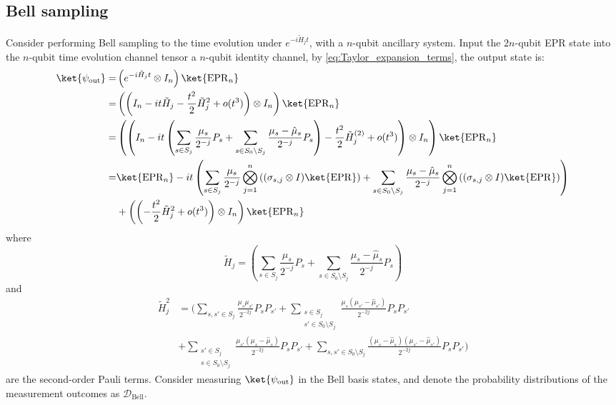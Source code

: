 \documentclass[twocolumn,superscriptaddress,aps,showpacs,amsmath,amstex,amssymb,citeautoscript,floatfix,pra,preprintnumbers]{revtex4-2}
\theoremstyle{plain}
\theoremstyle{plain}
\theoremstyle{plain}
\theoremstyle{plain}
\theoremstyle{plain}
\theoremstyle{plain}
\newcommand{\EPR}{\mathrm{EPR}}
\begin{document}
\begin{appendix}
\subsection{Bell sampling}
\label{sec:Bell_sampling}
Consider performing Bell sampling to the time evolution under $e^{-i\tilde{H}_jt}$, with a $n$-qubit ancillary system. Input the $2n$-qubit EPR state into the $n$-qubit time evolution channel tensor a $n$-qubit identity channel, by \eqref{eq:Taylor_expansion_terms}, the output state is:
\begin{equation}
\begin{split}
    \ket{\psi_{\text{out}}} =& \left(e^{-i\tilde{H}_jt}\otimes I_n\right)\ket{\EPR_n}\\
    =& \left(\left(I_n - it\tilde{H}_j - \frac{t^2}{2}\tilde{H}_j^{2} + o(t^3) \right)\otimes I_n\right)\ket{\EPR_n}\\
    =& \left(\left(I_n - it\left(\sum_{s\in S_j}\frac{\mu_s}{2^{-j}}P_s + \sum_{s\in S_0\setminus S_j}\frac{\mu_s-\hat{\mu}_s}{2^{-j}}P_s\right) - \frac{t^2}{2}\tilde{H}_j^{(2)} + o(t^3) \right)\otimes I_n\right)\ket{\EPR_n}\\
    =& \ket{\EPR_n} - it\left(\sum_{s\in S_j}\frac{\mu_s}{2^{-j}}\bigotimes_{j=1}^n \left((\sigma_{s,j}\otimes I)\ket{\EPR}\right) + \sum_{s\in S_0\setminus S_j}\frac{\mu_s-\hat{\mu}_s}{2^{-j}}\bigotimes_{j=1}^n \left((\sigma_{s,j}\otimes I)\ket{\EPR}\right)\right)\\
    &+ \left(\left(- \frac{t^2}{2}\tilde{H}_j^{2} + o(t^3)\right)\otimes I_n\right)\ket{\EPR_n}
\end{split}
\end{equation}
where
\begin{equation}
    \tilde{H}_j = \left(\sum_{s\in S_j}\frac{\mu_s}{2^{-j}}P_s + \sum_{s\in S_0\setminus S_j}\frac{\mu_s-\hat{\mu}_s}{2^{-j}}P_s\right)
\end{equation}
and
\begin{equation}
\begin{aligned}
     \tilde{H}_j^{2} &= \Bigg(\sum_{s,s'\in S_j}\frac{\mu_s\mu_{s'}}{2^{-2j}}P_sP_{s'} + \sum_{\substack{s\in S_j\\s'\in S_0\setminus S_j}}\frac{\mu_s(\mu_{s'}-\hat{\mu}_{s'})}{2^{-2j}}P_sP_{s'} \\
     &+ \sum_{\substack{s'\in S_j\\s\in S_0\setminus S_j}}\frac{\mu_{s'}(\mu_s-\hat{\mu}_s)}{2^{-2j}}P_sP_{s'} + \sum_{s,s'\in S_0\setminus S_j}\frac{(\mu_s-\hat{\mu}_s)(\mu_{s'}-\hat{\mu}_{s'})}{2^{-2j}}P_sP_{s'}\Bigg)
\end{aligned}
\end{equation}
are the second-order Pauli terms.
Consider measuring $\ket{\psi_{\text{out}}}$ in the Bell basis states, and denote the probability distributions of the measurement outcomes as $\mathcal{D}_{\text{Bell}}$. 


\end{appendix}
\end{document}
